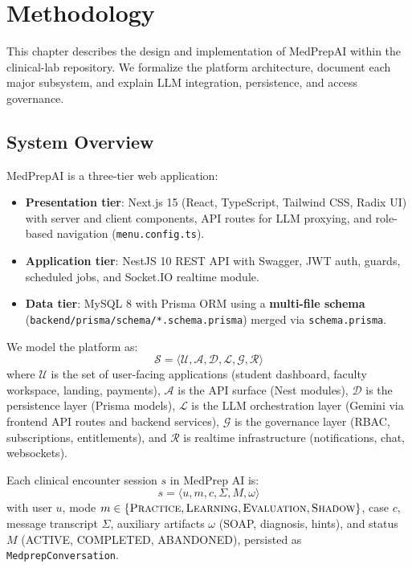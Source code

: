 \chapter{Methodology}
\label{ch:method}

This chapter describes the design and implementation of MedPrepAI within the clinical-lab repository. We formalize the platform architecture, document each major subsystem, and explain LLM integration, persistence, and access governance.

\section{System Overview}
MedPrepAI is a three-tier web application:
\begin{itemize}
  \item \textbf{Presentation tier}: Next.js 15 (React, TypeScript, Tailwind CSS, Radix UI) with server and client components, API routes for LLM proxying, and role-based navigation (\texttt{menu.config.ts}).
  \item \textbf{Application tier}: NestJS 10 REST API with Swagger, JWT auth, guards, scheduled jobs, and Socket.IO realtime module.
  \item \textbf{Data tier}: MySQL 8 with Prisma ORM using a \textbf{multi-file schema} (\texttt{backend/prisma/schema/*.schema.prisma}) merged via \texttt{schema.prisma}.
\end{itemize}

We model the platform as:
\begin{equation}
\mathcal{S} = \langle \mathcal{U}, \mathcal{A}, \mathcal{D}, \mathcal{L}, \mathcal{G}, \mathcal{R} \rangle
\end{equation}
where $\mathcal{U}$ is the set of user-facing applications (student dashboard, faculty workspace, landing, payments), $\mathcal{A}$ is the API surface (Nest modules), $\mathcal{D}$ is the persistence layer (Prisma models), $\mathcal{L}$ is the LLM orchestration layer (Gemini via frontend API routes and backend services), $\mathcal{G}$ is the governance layer (RBAC, subscriptions, entitlements), and $\mathcal{R}$ is realtime infrastructure (notifications, chat, websockets).

Each clinical encounter session $s$ in MedPrep AI is:
\begin{equation}
s = \langle u, m, c, \Sigma, M, \omega \rangle
\end{equation}
with user $u$, mode $m \in \{\textsc{Practice}, \textsc{Learning}, \textsc{Evaluation}, \textsc{Shadow}\}$, case $c$, message transcript $\Sigma$, auxiliary artifacts $\omega$ (SOAP, diagnosis, hints), and status $M$ (ACTIVE, COMPLETED, ABANDONED), persisted as \texttt{MedprepConversation}.

